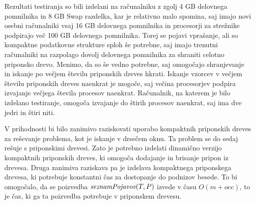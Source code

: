 Rezultati testiranja so bili izdelani na računalniku z zgolj 4 GB delovnega pomnilnika in 8 GB Swap razdelka, kar je relativno malo spomina, saj imajo novi osebni računalniki vsaj 16 GB delovnega pomnilnika in procesorji za strežnike podpirajo več 100 GB delovnega pomnilnika. Torej se pojavi vprašanje, ali so kompaktne podatkovne strukture sploh še potrebne, saj imajo trenutni računalniki na razpolago dovolj delovnega pomnilnika za shraniti celotno priponsko drevo. Menimo, da so še vedno potrebne, saj omogočajo shranjevanje in iskanje po večjem številu priponskih dreves hkrati. Iskanje vzorcev v večjem številu priponskih dreves naenkrat je mogoče, saj večina procesorjev podpira izvajanje večjega števila procesov naenkrat. Računalnik, na katerem je bilo izdelano testiranje, omogoča izvajanje do štirih procesov naenkrat, saj ima dve jedri in štiri niti.


V prihodnosti bi bilo zanimivo raziskovati uporabo kompaktnih priponskih dreves za reševanje problema, kot je iskanje v drsečem oknu. Ta problem se do sedaj rešuje s priponskimi drevesi. Zato je potrebno izdelati dinamično verzijo kompaktnih priponskih dreves, ki omogoča dodajanje in brisanje pripon iz drevesa. Druga zanimiva raziskava pa je izdelava kompaktnega priponskega drevesa, ki potrebuje konstantni čas za dostopanje do podnizov besede. To bi omogočalo, da se poizvedba $ \mathop{\textit{seznamPojavov}}(T,P) $ izvede v času $O(m+occ)$, to je čas, ki ga ta poizvedba potrebuje v priponskem drevesu.
